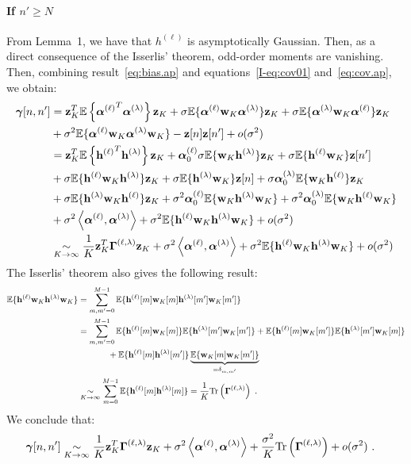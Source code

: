 \documentclass[journal,onecolumn]{IEEEtran}
\begin{document}
\paragraph{If $n'\geq N$}
From Lemma~1, we have that $h^{(\ell)}$ is asymptotically Gaussian. Then, as a direct consequence of the Isserlis' theorem, odd-order moments are vanishing. Then, combining result~\eqref{eq:bias.ap} and equations~\eqref{I-eq:cov01} and~\eqref{eq:cov.ap}, we obtain:
\begin{align*}  
\boldsymbol{\gamma}[n,n'] &= {\mathbf z}_K^T{\mathbb E}\left\{{\boldsymbol{\alpha}^{(\ell)}}^T\boldsymbol{\alpha}^{(\lambda)}\right\}{\mathbf z}_K + \sigma{\mathbb E}\{\boldsymbol{\alpha}^{(\ell)}{\mathbf w}_K\boldsymbol{\alpha}^{(\lambda)}\}{\mathbf z}_K+ \sigma{\mathbb E}\{\boldsymbol{\alpha}^{(\lambda)}{\mathbf w}_K\boldsymbol{\alpha}^{(\ell)}\}{\mathbf z}_K \\
& +\sigma^2{\mathbb E}\{\boldsymbol{\alpha}^{(\ell)}{\mathbf w}_K\boldsymbol{\alpha}^{(\lambda)}{\mathbf w}_K\}-{\mathbf z}[n]{\mathbf z}[n']+o(\sigma^2) \\
&= {\mathbf z}_K^T{\mathbb E}\left\{{{\mathbf h}^{(\ell)}}^T{\mathbf h}^{(\lambda)}\right\}{\mathbf z}_K + \boldsymbol{\alpha}_0^{(\ell)}\sigma{\mathbb E}\{{\mathbf w}_K{\mathbf h}^{(\lambda)}\}{\mathbf z}_K + \sigma{\mathbb E}\{{\mathbf h}^{(\ell)}{\mathbf w}_K\}{\mathbf z}[n']  \\
&+ \sigma{\mathbb E}\{{\mathbf h}^{(\ell)}{\mathbf w}_K{\mathbf h}^{(\lambda)}\}{\mathbf z}_K+ \sigma{\mathbb E}\{{\mathbf h}^{(\lambda)}{\mathbf w}_K\}{\mathbf z}[n] + \sigma\boldsymbol{\alpha}_0^{(\lambda)}{\mathbb E}\{{\mathbf w}_K{\mathbf h}^{(\ell)}\}{\mathbf z}_K \\
& + \sigma{\mathbb E}\{{\mathbf h}^{(\lambda)}{\mathbf w}_K{\mathbf h}^{(\ell)}\}{\mathbf z}_K+\sigma^2\boldsymbol{\alpha}_0^{(\ell)}{\mathbb E}\{{\mathbf w}_K{\mathbf h}^{(\lambda)}{\mathbf w}_K\}+\sigma^2\boldsymbol{\alpha}_0^{(\lambda)}{\mathbb E}\{{\mathbf w}_K{\mathbf h}^{(\ell)}{\mathbf w}_K\} \\
&+\sigma^2\left\langle\boldsymbol{\alpha}^{(\ell)},\boldsymbol{\alpha}^{(\lambda)}\right\rangle +\sigma^2{\mathbb E}\{{\mathbf h}^{(\ell)}{\mathbf w}_K{\mathbf h}^{(\lambda)}{\mathbf w}_K\} + o(\sigma^2) \\
&\underset{K\to\infty}{\sim} \dfrac1K{\mathbf z}_K^T\boldsymbol{\Gamma}^{(\ell,\lambda)}{\mathbf z}_K +\sigma^2\left\langle\boldsymbol{\alpha}^{(\ell)},\boldsymbol{\alpha}^{(\lambda)}\right\rangle +\sigma^2{\mathbb E}\{{\mathbf h}^{(\ell)}{\mathbf w}_K{\mathbf h}^{(\lambda)}{\mathbf w}_K\} + o(\sigma^2)
\end{align*}
The Isserlis' theorem also gives the following result:
\begin{align*}
{\mathbb E}\{{\mathbf h}^{(\ell)}{\mathbf w}_K{\mathbf h}^{(\lambda)}{\mathbf w}_K\} &= \sum_{m,m'=0}^{M-1}{\mathbb E}\{{\mathbf h}^{(\ell)}[m]{\mathbf w}_K[m]{\mathbf h}^{(\lambda)}[m']{\mathbf w}_K[m']\} \\
&= \sum_{m,m'=0}^{M-1}{\mathbb E}\{{\mathbf h}^{(\ell)}[m]{\mathbf w}_K[m]\}{\mathbb E}\{{\mathbf h}^{(\lambda)}[m']{\mathbf w}_K[m']\} + {\mathbb E}\{{\mathbf h}^{(\ell)}[m]{\mathbf w}_K[m']\}{\mathbb E}\{{\mathbf h}^{(\lambda)}[m']{\mathbf w}_K[m]\} \\
&\hspace{35pt} + {\mathbb E}\{{\mathbf h}^{(\ell)}[m]{\mathbf h}^{(\lambda)}[m']\}\underbrace{{\mathbb E}\{{\mathbf w}_K[m]{\mathbf w}_K[m']\}}_{=\delta_{m,m'}} \\
&\underset{K\to\infty}{\sim} \sum_{m=0}^{M-1} {\mathbb E}\{{\mathbf h}^{(\ell)}[m]{\mathbf h}^{(\lambda)}[m]\} = \dfrac1K{\mathrm{Tr}}\left(\boldsymbol{\Gamma}^{(\ell,\lambda)}\right)\ .
\end{align*}
We conclude that:
\begin{align*}  
\boldsymbol{\gamma}[n,n'] &\underset{K\to\infty}{\sim} \dfrac1K{\mathbf z}_K^T\boldsymbol{\Gamma}^{(\ell,\lambda)}{\mathbf z}_K +\sigma^2\left\langle\boldsymbol{\alpha}^{(\ell)},\boldsymbol{\alpha}^{(\lambda)}\right\rangle +\dfrac{\sigma^2}{K}{\mathrm{Tr}}\left(\boldsymbol{\Gamma}^{(\ell,\lambda)}\right) + o(\sigma^2)\ .
\end{align*}
\end{document}
